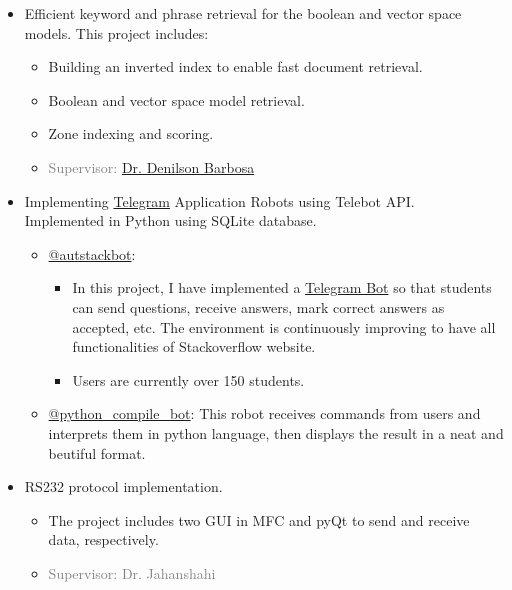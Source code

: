 \begin{itemize}
		\item Efficient keyword and phrase retrieval for the boolean and vector space models. This project includes:
		\begin{itemize}
			\item Building an inverted index to enable fast document retrieval.
			\item Boolean and vector space model retrieval.
			\item Zone indexing and scoring.
			\item \textcolor{gray}{Supervisor: \href{https://sites.ualberta.ca/~denilson/}{Dr. Denilson Barbosa}}
		\end{itemize}
	
		\item Implementing \href{https://telegram.org/}{Telegram} Application Robots using Telebot API.\\
		Implemented in Python using SQLite database.
		\begin{itemize}
			\item \href{https://telegram.me/autstackbot}{@autstackbot}:
			\begin{itemize}
				\item In this project, I have implemented a \href{https://telegram.org/blog/bot-revolution}{Telegram Bot} so that students can send questions, receive answers, mark correct answers as accepted, etc. The environment is continuously improving to have all functionalities of Stackoverflow website.
				\item Users are currently over 150 students.
			\end{itemize}
			\item \href{https://telegram.me/python_compile_bot}{@python\_compile\_bot}: This robot receives commands from users and interprets them in python language, then displays the result in a neat and beutiful format.
		\end{itemize}
		
		\item RS232 protocol implementation.
		\begin{itemize}
			\item The project includes two GUI in MFC and pyQt to send and receive data, respectively. 
			\item \textcolor{gray}{Supervisor: Dr. Jahanshahi}
		\end{itemize}
	
	
	\end{itemize}

